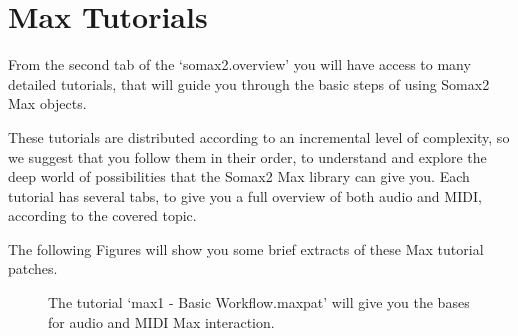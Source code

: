 \section{Max Tutorials}

From the second tab of the `somax2.overview' you will have access to many detailed tutorials, that will guide you through the basic steps of using Somax2 Max objects. 

These tutorials are distributed according to an incremental level of complexity, so we suggest that you follow them in their order, to understand and explore the deep world of possibilities that the Somax2 Max library can give you.
Each tutorial has several tabs, to give you a full overview of both audio and MIDI, according to the covered topic.

The following Figures will show you some brief extracts of these Max tutorial patches.




\begin{figure}[H]
  \centering
  \hfill
  \caption{The tutorial `max1 - Basic Workflow.maxpat' will give you the bases for audio and MIDI Max interaction.}
\end{figure}

